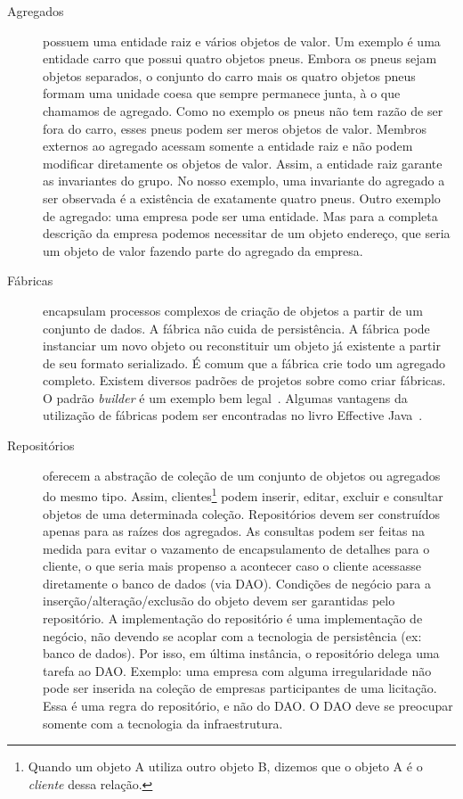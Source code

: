 \documentclass[a4paper, 12pt]{article}
\begin{document}
\begin{description}

\item [Agregados] possuem uma entidade raiz e vários objetos de valor. Um exemplo é uma entidade carro que possui quatro objetos pneus. Embora os pneus sejam objetos separados, o conjunto do carro mais os quatro objetos pneus formam uma unidade coesa que sempre permanece junta, à o que chamamos de agregado. Como no exemplo os pneus não tem razão de ser fora do carro, esses pneus podem ser meros objetos de valor. Membros externos ao agregado acessam somente a entidade raiz e não podem modificar diretamente os objetos de valor. Assim, a entidade raiz garante as invariantes do grupo. No nosso exemplo, uma invariante do agregado a ser observada é a existência de exatamente quatro pneus. Outro exemplo de agregado: uma empresa pode ser uma entidade. Mas para a completa descrição da empresa podemos necessitar de um objeto endereço, que seria um objeto de valor fazendo parte do agregado da empresa.

\item [Fábricas] encapsulam processos complexos de criação de objetos a partir de um conjunto de dados. A fábrica não cuida de persistência. A fábrica pode instanciar um novo objeto ou reconstituir um objeto já existente a partir de seu formato serializado. É comum que a fábrica crie todo um agregado completo.
Existem diversos padrões de projetos sobre como criar fábricas. O padrão \emph{builder} é um exemplo bem legal~\cite{Bloch2008Builder}. Algumas vantagens da utilização de fábricas podem ser encontradas no livro Effective Java~\cite{Bloch2008Factory}. 

\item [Repositórios] oferecem a abstração de coleção de um conjunto de objetos ou agregados do mesmo tipo. Assim, clientes\footnote{Quando um objeto A utiliza outro objeto B, dizemos que o objeto A é o \emph{cliente} dessa relação.} podem inserir, editar, excluir e consultar objetos de uma determinada coleção. Repositórios devem ser construídos apenas para as raízes dos agregados. As consultas podem ser feitas na medida para evitar o vazamento de encapsulamento de detalhes para o cliente, o que seria mais propenso a acontecer caso o cliente acessasse diretamente o banco de dados (via DAO). Condições de negócio para a inserção/alteração/exclusão do objeto devem ser garantidas pelo repositório. A implementação do repositório é uma implementação de negócio, não devendo se acoplar com a tecnologia de persistência (ex: banco de dados). Por isso, em última instância, o repositório delega uma tarefa ao DAO. Exemplo: uma empresa com alguma irregularidade não pode ser inserida na coleção de empresas participantes de uma licitação. Essa é uma regra do repositório, e não do DAO. O DAO deve se preocupar somente com a tecnologia da infraestrutura.

\end{description}
\end{document}

